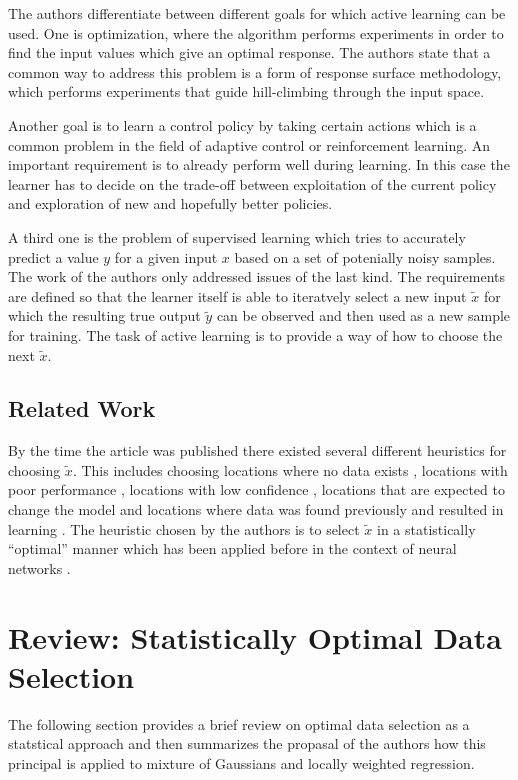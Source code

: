 \documentclass{article}
\newcommand{\xt}{\tilde{x}}
\newcommand{\yt}{\tilde{y}}
\begin{document}
The authors differentiate between different goals for which active learning can be
used. One is optimization, where the algorithm performs experiments
in order to find the input values which give an optimal response. The authors
state that a common way to address this problem is a form of response surface
methodology\cite{box1987}, which performs experiments that guide hill-climbing
through the input space.

Another goal is to learn a control policy by taking certain actions which is
a common problem in the field of adaptive control or reinforcement learning.
An important requirement is to already perform well during learning. In
this case the learner has to decide on the trade-off between exploitation of
the current policy and exploration of new and hopefully better policies.

A third one is the problem of supervised learning which tries to accurately
predict a value $y$ for a given input $x$ based on a set of potenially noisy
samples. The work of the authors only addressed issues of the last kind.
The requirements are defined so that the learner itself is able to iteratvely select
a new input $\xt$ for which the resulting true output $\yt$ can be observed and
then used as a new sample for training. The task of active learning is to provide
a way of how to choose the next $\xt$.

\subsection{Related Work}
\label{sec:work}
By the time the article was published there existed several different heuristics
for choosing $\xt$. This includes choosing locations where no data exists
\cite{whitehead1991study}, locations with poor performance \cite{linden1993implementing},
locations with low confidence \cite{thrun1991active}, locations that are
expected to change the model \cite{cohn1994improving} and locations where data
was found previously and resulted in learning \cite{storck1995reinforcement}.
The heuristic chosen by the authors is to select $\xt$ in a statistically
``optimal'' manner which has been applied before in the context of neural
networks \cite{mackay1992information}.



\section{Review: Statistically Optimal Data Selection}
The following section provides a brief review on optimal data selection as
a statstical approach and then summarizes the propasal of the authors how
this principal is applied to mixture of Gaussians and locally weighted regression.
\end{document}
